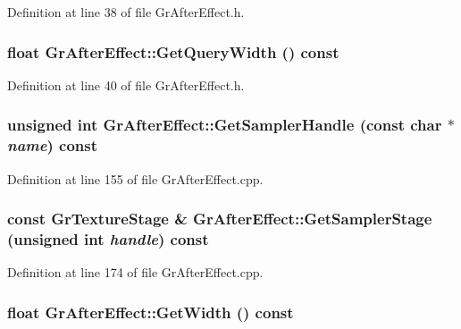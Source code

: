 Definition at line 38 of file GrAfterEffect.h.\hypertarget{class_gr_after_effect_3725e6efbe22dd48c67ca96fdbe33855}{
\subsubsection[{GetQueryWidth}]{\setlength{\rightskip}{0pt plus 5cm}float GrAfterEffect::GetQueryWidth () const}}
\label{class_gr_after_effect_3725e6efbe22dd48c67ca96fdbe33855}




Definition at line 40 of file GrAfterEffect.h.\hypertarget{class_gr_after_effect_0778fe881cb1fe1ebe2126d27bd8f34f}{
\subsubsection[{GetSamplerHandle}]{\setlength{\rightskip}{0pt plus 5cm}unsigned int GrAfterEffect::GetSamplerHandle (const char $\ast$ {\em name}) const}}
\label{class_gr_after_effect_0778fe881cb1fe1ebe2126d27bd8f34f}




Definition at line 155 of file GrAfterEffect.cpp.\hypertarget{class_gr_after_effect_13d36149166c9667c6a6994c1f3c1cdc}{
\subsubsection[{GetSamplerStage}]{\setlength{\rightskip}{0pt plus 5cm}const {\bf GrTextureStage} \& GrAfterEffect::GetSamplerStage (unsigned int {\em handle}) const}}
\label{class_gr_after_effect_13d36149166c9667c6a6994c1f3c1cdc}




Definition at line 174 of file GrAfterEffect.cpp.\hypertarget{class_gr_after_effect_9c9c819b5a476c965ad41b76e1b284dc}{
\subsubsection[{GetWidth}]{\setlength{\rightskip}{0pt plus 5cm}float GrAfterEffect::GetWidth () const}}
\label{class_gr_after_effect_9c9c819b5a476c965ad41b76e1b284dc}




